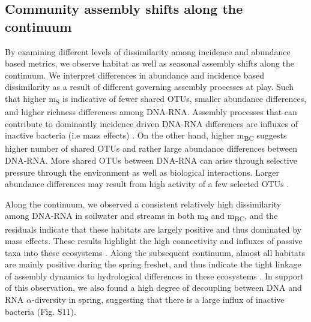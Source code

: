 \documentclass[12pt,a4paper]{article} %
\begin{document}
\subsection*{Community assembly shifts along the continuum}
By examining different levels of dissimilarity among incidence and abundance based metrics, we observe habitat as well as seasonal assembly shifts along the continuum. We interpret differences in abundance and incidence based dissimilarity as a result of different governing assembly processes at play. Such that higher m\textsubscript{S} is indicative of fewer shared OTUs, smaller abundance differences, and higher richness differences among DNA-RNA. Assembly processes that can contribute to dominantly incidence driven DNA-RNA differences are influxes of inactive bacteria (i.e mass effects) \citep{Leibold2004a}. On the other hand, higher m\textsubscript{BC} suggests higher number of shared OTUs and rather large abundance differences between DNA-RNA. More shared OTUs between DNA-RNA can arise through selective pressure through the environment as well as biological interactions. Larger abundance differences may result from high activity of a few selected OTUs \citep{Campbell2013}.

Along the continuum, we observed a consistent relatively high dissimilarity among DNA-RNA in soilwater and streams in both m\textsubscript{S} and m\textsubscript{BC}, and the residuals indicate that these habitats are largely positive and thus dominated by mass effects. These results highlight the high connectivity and influxes of passive taxa into these ecosystems \citep{Ruiz-Gonzalez2015, Hauptmann2016, Crump2012}. Along the subsequent continuum, almost all habitats are mainly positive during the spring freshet, and thus indicate the tight linkage of assembly dynamics to hydrological differences in these ecosystems \citep{Nino-Garcia2016, Read2015}. In support of this observation, we also found a high degree of decoupling between DNA and RNA $\alpha$-diversity in spring, suggesting that there is a large influx of inactive bacteria (Fig. S11).
\end{document}
